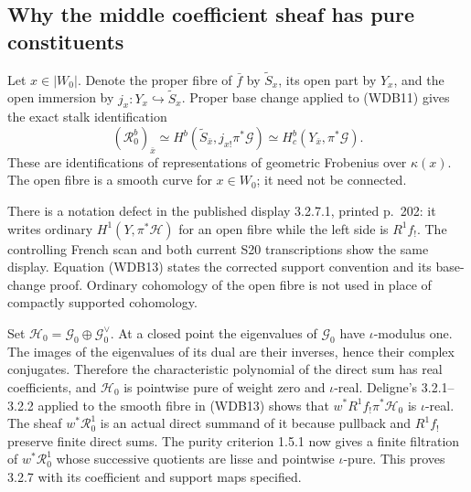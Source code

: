 \subsection{Why the middle coefficient sheaf has pure constituents}

Let \(x\in|W_0|\). Denote the proper fibre of \(\bar f\) by
\(\widetilde S_x\), its open part by \(Y_x\), and the open
immersion by \(j_x:Y_x\hookrightarrow\widetilde S_x\). Proper
base change applied to (WDB11) gives the exact stalk identification
\[
 (\mathcal R^b_0)_{\bar x}
 \simeq H^b(\widetilde S_{\bar x},
                j_{x!}\pi^*\mathcal G)
 \simeq H_c^b(Y_{\bar x},\pi^*\mathcal G).
 \tag{WDB13}
\]
These are identifications of representations of geometric Frobenius
over \(\kappa(x)\). The open fibre is a smooth curve for
\(x\in W_0\); it need not be connected.

There is a notation defect in the published display 3.2.7.1, printed
p.~202: it writes ordinary \(H^1(Y,\pi^*\mathcal H)\) for an
open fibre while the left side is \(R^1f_!\). The controlling French
scan and both current S20 transcriptions show the same display.
Equation (WDB13) states the corrected support convention and its
base-change proof. Ordinary cohomology of the open fibre is not used
in place of compactly supported cohomology.

Set \(\mathcal H_0=\mathcal G_0\oplus\mathcal G_0^\vee\).
At a closed point the eigenvalues of \(\mathcal G_0\) have
\(\iota\)-modulus one. The images of the eigenvalues of its dual
are their inverses, hence their complex conjugates. Therefore the
characteristic polynomial of the direct sum has real coefficients,
and \(\mathcal H_0\) is pointwise pure of weight zero and
\(\iota\)-real. Deligne's 3.2.1--3.2.2 applied to the smooth fibre
in (WDB13) shows that
\(w^*R^1f_!\pi^*\mathcal H_0\) is \(\iota\)-real.
The sheaf \(w^*\mathcal R^1_0\) is an actual direct summand of
it because pullback and \(R^1f_!\) preserve finite direct sums.
The purity criterion 1.5.1 now gives a finite filtration of
\(w^*\mathcal R^1_0\) whose successive quotients are lisse and
pointwise \(\iota\)-pure. This proves 3.2.7 with its coefficient
and support maps specified.

